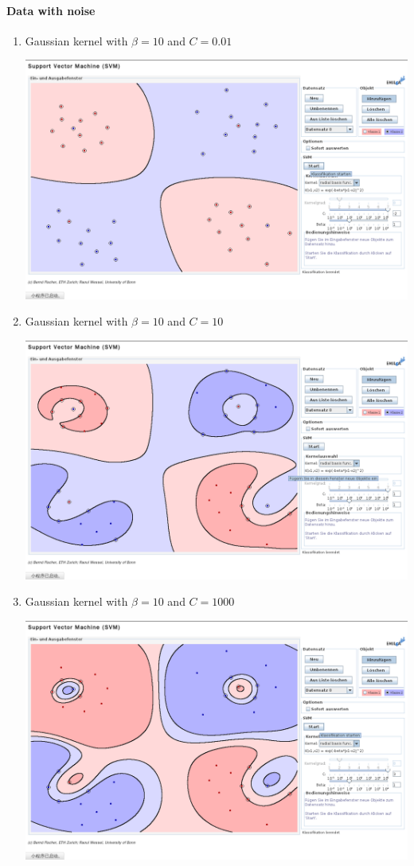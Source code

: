 \documentclass{article}[11pt]
\begin{document}
\paragraph{Data with noise}
\begin{enumerate}
\item 
Gaussian kernel with $\beta = 10$ and $C=0.01$
\begin{center}
  \includegraphics[width=.9\textwidth]{b-rbf-b1-c-2}
\end{center}

\item 
Gaussian kernel with $\beta = 10$ and $C=10$
\begin{center}
  \includegraphics[width=.9\textwidth]{b-rbf-b1-c1}
\end{center}

\item 
Gaussian kernel with $\beta = 10$ and $C=1000$
\begin{center}
  \includegraphics[width=.9\textwidth]{b-rbf-b1-c3}
\end{center}

\end{enumerate}
\end{document}
